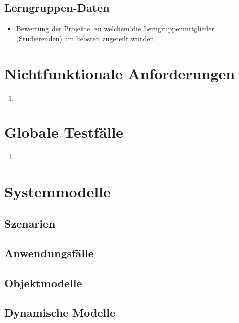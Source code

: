 \documentclass[parskip=full]{scrartcl}
\begin{document}
\subsection{Lerngruppen-Daten} 
\begin{itemize} 
  \item Bewertung der Projekte, zu welchem die Lerngruppenmitglieder
  (Studierenden) am liebsten zugeteilt würden.
\end{itemize}

\section{Nichtfunktionale Anforderungen}
\begin{enumerate}
  \item 
\end{enumerate}
\section{Globale Testfälle}
\begin{enumerate}
  \item 
\end{enumerate}
\section{Systemmodelle}

\subsection{Szenarien}

\subsection{Anwendungsfälle}

\subsection{Objektmodelle}

\subsection{Dynamische Modelle}
\end{document}
